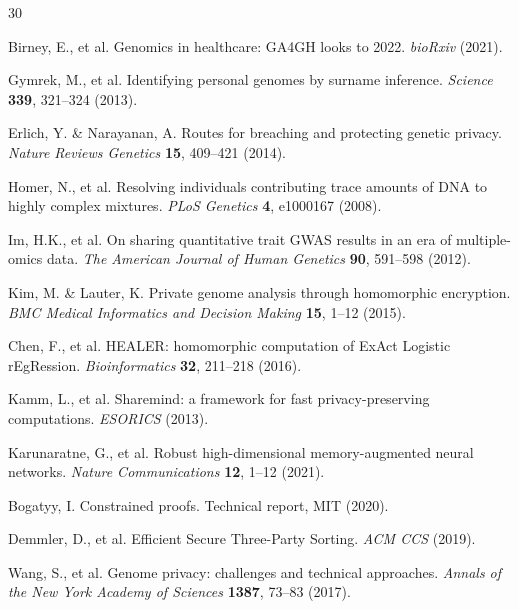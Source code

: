 \documentclass[11pt,a4paper]{article}
\begin{document}
\begin{thebibliography}{30}

Birney, E., et al.
\newblock Genomics in healthcare: GA4GH looks to 2022.
\newblock \emph{bioRxiv} (2021).

Gymrek, M., et al.
\newblock Identifying personal genomes by surname inference.
\newblock \emph{Science} \textbf{339}, 321--324 (2013).

Erlich, Y. \& Narayanan, A.
\newblock Routes for breaching and protecting genetic privacy.
\newblock \emph{Nature Reviews Genetics} \textbf{15}, 409--421 (2014).

Homer, N., et al.
\newblock Resolving individuals contributing trace amounts of DNA to highly complex mixtures.
\newblock \emph{PLoS Genetics} \textbf{4}, e1000167 (2008).

Im, H.K., et al.
\newblock On sharing quantitative trait GWAS results in an era of multiple-omics data.
\newblock \emph{The American Journal of Human Genetics} \textbf{90}, 591--598 (2012).

Kim, M. \& Lauter, K.
\newblock Private genome analysis through homomorphic encryption.
\newblock \emph{BMC Medical Informatics and Decision Making} \textbf{15}, 1--12 (2015).

Chen, F., et al.
\newblock HEALER: homomorphic computation of ExAct Logistic rEgRession.
\newblock \emph{Bioinformatics} \textbf{32}, 211--218 (2016).

Kamm, L., et al.
\newblock Sharemind: a framework for fast privacy-preserving computations.
\newblock \emph{ESORICS} (2013).

Karunaratne, G., et al.
\newblock Robust high-dimensional memory-augmented neural networks.
\newblock \emph{Nature Communications} \textbf{12}, 1--12 (2021).

Bogatyy, I.
\newblock Constrained proofs.
\newblock Technical report, MIT (2020).

Demmler, D., et al.
\newblock Efficient Secure Three-Party Sorting.
\newblock \emph{ACM CCS} (2019).

Wang, S., et al.
\newblock Genome privacy: challenges and technical approaches.
\newblock \emph{Annals of the New York Academy of Sciences} \textbf{1387}, 73--83 (2017).


\end{thebibliography}
\end{document}
